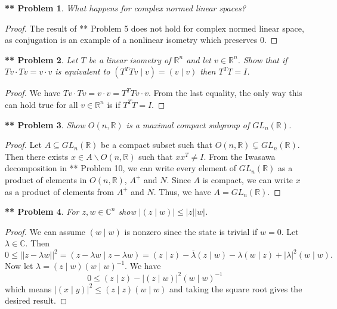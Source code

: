 \documentclass{article}
\newtheorem{**}{** Problem}
\begin{document}
\begin{flushleft}
\begin{**}
What happens for complex normed linear spaces?
\end{**}
\begin{proof}
The result of ** Problem 5 does not hold for complex normed linear space, as conjugation is an example of a nonlinear isometry which preserves $0$.
\end{proof}

\begin{**}
Let $T$ be a linear isometry of $\mathbb{R}^n$ and let $v \in \mathbb{R}^n$. Show that if $Tv \cdot Tv = v \cdot v$ is equivalent to $(T^TTv \mid v) = (v \mid v)$ then $T^TT = I$.
\end{**}
\begin{proof}
We have $Tv \cdot Tv = v \cdot v = T^TTv \cdot v$. From the last equality, the only way this can hold true for all $v \in \mathbb{R}^n$ is if $T^TT = I$.
\end{proof}

\begin{**}
Show $O(n, \mathbb{R})$ is a maximal compact subgroup of $GL_n(\mathbb{R})$.
\end{**}
\begin{proof}
Let $A \subseteq GL_n (\mathbb{R})$ be a compact subset such that $O(n, \mathbb{R}) \subsetneq GL_n (\mathbb{R})$. Then there exists $x \in A \backslash O(n, \mathbb{R})$ such that $xx^T \neq I$. From the Iwasawa decomposition in ** Problem 10, we can write every element of $GL_n (\mathbb{R})$ as a product of elements in $O (n, \mathbb{R})$, $A^+$ and $N$. Since $A$ is compact, we can write $x$ as a product of elements from $A^+$ and $N$. Thus, we have $A = GL_n (\mathbb{R})$.
\end{proof}

\begin{**}
For $z, w \in \mathbb{C}^n$ show $|(z \mid w)| \leq |z||w|$.
\end{**}
\begin{proof}
We can assume $(w \mid w)$ is nonzero since the state is trivial if $w = 0$. Let $\lambda \in \mathbb{C}$. Then
\[
0 \leq ||z - \lambda w||^2 = (z - \lambda w \mid z - \lambda w) = (z \mid z) - \overline{\lambda}(z \mid w) - \lambda (w \mid z) + |\lambda|^2 (w \mid w).
\]
Now let $\lambda = (z \mid w) (w \mid w)^{-1}$. We have
\[
0 \leq (z \mid z) - |(z \mid w)|^2 (w \mid w)^{-1}
\]
which means $|(x \mid y)|^2 \leq (z \mid z) (w \mid w)$ and taking the square root gives the desired result.
\end{proof}


\end{flushleft}
\end{document}
